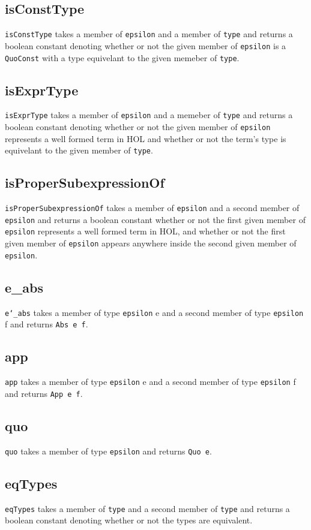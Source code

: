\documentclass{article}
\def\c#1{\texttt{#1}}
\begin{document}
\subsection{isConstType}
\c{isConstType} takes a member of \c{epsilon} and a member of \c{type} and returns a boolean constant denoting whether or not the given member of \c{epsilon} is a \c{QuoConst} with a type equivelant to the given memeber of \c{type}.

\subsection{isExprType}
\c{isExprType} takes a member of \c{epsilon} and a memeber of \c{type} and returns a boolean constant denoting whether or not the given member of \c{epsilon} represents a well formed term in HOL and whether or not the term's type is equivelant to the given member of \c{type}.

\subsection{isProperSubexpressionOf}
\c{isProperSubexpressionOf} takes a member of \c{epsilon} and a second member of \c{epsilon} and returns a boolean constant whether or not the first given member of \c{epsilon} represents a well formed term in HOL, and whether or not the first given member of \c{epsilon} appears anywhere inside the second given member of \c{epsilon}.

\subsection{e\_abs}
\c{e\char`\_abs} takes a member of type \c{epsilon} e and a second member of type \c{epsilon} f and returns \c{Abs e f}.

\subsection{app}
\c{app} takes a member of type \c{epsilon} e and a second member of type \c{epsilon} f and returns \c{App e f}.

\subsection{quo}
\c{quo} takes a member of type \c{epsilon} and returns \c{Quo e}.

\subsection{eqTypes}
\c{eqTypes} takes a member of \c{type} and a second member of \c{type} and returns a boolean constant denoting whether or not the types are equivalent.
\end{document}
